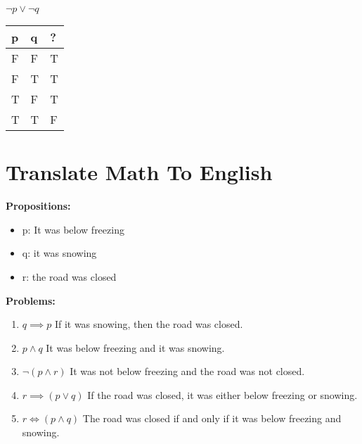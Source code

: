 \documentclass[a4paper]{article}
\begin{document}
\begin{enumerate}
    $\neg p \lor \neg q$
    
    \begin{center}
        \begin{tabularx}{0.8\textwidth}{| Y | Y | Y |}
        \hline
        \textbf{p} & \textbf{q} & \textbf{?} \\ [1ex]
        \hline
        F & F & T \\
        \hline
        F & T & T \\
        \hline
        T & F & T \\
        \hline
        T & T & F \\
        \hline
        \end{tabularx}
    \end{center}
\end{enumerate}

\bigskip


\section{Translate Math To English}
\textbf{Propositions:}
\begin{itemize}
    \item p: It was below freezing
    \item q: it was snowing
    \item r: the road was closed
\end{itemize}
\textbf{Problems:}
\begin{enumerate}
\boldmath
    \item $q \boldsymbol{\implies} p$ If it was snowing, then the road was closed. \\
    \item $p \land q$ It was below freezing and it was snowing. \\
    \item $\neg(p \land r)$ It was not below freezing and the road was not closed. \\
    \item \textbf{$r \implies (p \lor q)$} If the road was closed, it was either below freezing or snowing. \\
    \item \textbf{$r \iff (p \land q)$} The road was closed if and only if it was below freezing and snowing. \\
\unboldmath
\end{enumerate}
\end{document}
